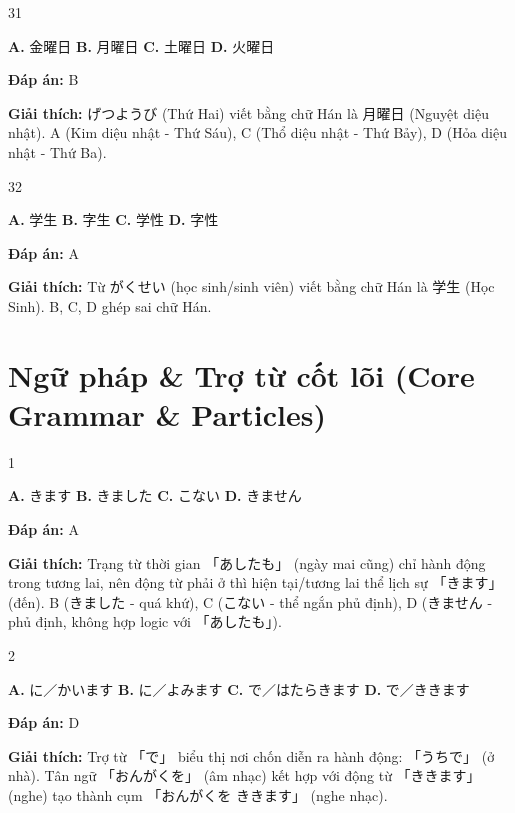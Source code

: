\documentclass[12pt,a4paper]{report}
\newcommand{\source}[1]{}
\newcommand{\choice}[2]{\textbf{#1.} #2 \quad}
\newcommand{\answer}[1]{\par\textbf{Đáp án:} #1}
\newcommand{\confidence}[1]{}
\newcommand{\explain}[1]{\par\textbf{Giải thích:} #1\vspace{0.5cm}}
\begin{document}
\begin{question}{31}
\source{Q5.webp}
\choice{A}{金曜日}
\choice{B}{月曜日}
\choice{C}{土曜日}
\choice{D}{火曜日}
\answer{B}
\confidence{high}
\explain{げつようび (Thứ Hai) viết bằng chữ Hán là 月曜日 (Nguyệt diệu nhật). A (Kim diệu nhật - Thứ Sáu), C (Thổ diệu nhật - Thứ Bảy), D (Hỏa diệu nhật - Thứ Ba).}
\end{question}

\begin{question}{32}
\source{Q5.webp}
\choice{A}{学生}
\choice{B}{字生}
\choice{C}{学性}
\choice{D}{字性}
\answer{A}
\confidence{high}
\explain{Từ がくせい (học sinh/sinh viên) viết bằng chữ Hán là 学生 (Học Sinh). B, C, D ghép sai chữ Hán.}
\end{question}

\chapter{Ngữ pháp \& Trợ từ cốt lõi (Core Grammar \& Particles)}

\begin{question}{1}
\source{Q2_46_20251121082801.webp}
\choice{A}{きます}
\choice{B}{きました}
\choice{C}{こない}
\choice{D}{きません}
\answer{A}
\confidence{high}
\explain{Trạng từ thời gian 「あしたも」 (ngày mai cũng) chỉ hành động trong tương lai, nên động từ phải ở thì hiện tại/tương lai thể lịch sự 「きます」 (đến). B (きました - quá khứ), C (こない - thể ngắn phủ định), D (きません - phủ định, không hợp logic với 「あしたも」).}
\end{question}

\begin{question}{2}
\source{Q9_106_20251121082813.webp}
\choice{A}{に／かいます}
\choice{B}{に／よみます}
\choice{C}{で／はたらきます}
\choice{D}{で／ききます}
\answer{D}
\confidence{high}
\explain{Trợ từ 「で」 biểu thị nơi chốn diễn ra hành động: 「うちで」 (ở nhà). Tân ngữ 「おんがくを」 (âm nhạc) kết hợp với động từ 「ききます」 (nghe) tạo thành cụm 「おんがくを ききます」 (nghe nhạc).}
\end{question}
\end{document}
